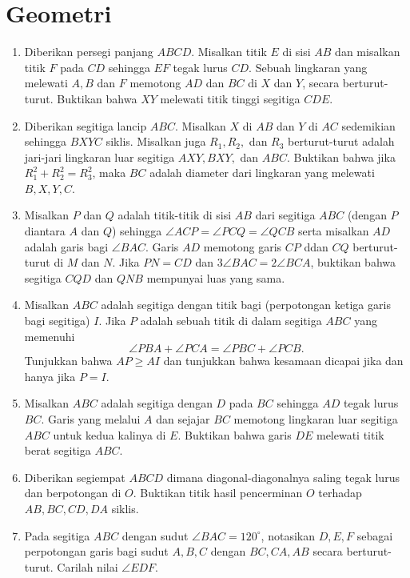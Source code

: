 \documentclass[12pt]{article}
\begin{document}
\section{Geometri}
\begin{enumerate}
	\item
	Diberikan persegi panjang $ABCD$. Misalkan titik $E$ di sisi $AB$ dan misalkan titik $F$ pada $CD$ sehingga $EF$ tegak lurus $CD$. Sebuah lingkaran yang melewati $A,B$ dan $F$ memotong $AD$ dan $BC$ di $X$ dan $Y$, secara berturut-turut. Buktikan bahwa $XY$ melewati titik tinggi segitiga $CDE$.
	
	\item
	Diberikan segitiga lancip $ABC$. Misalkan $X$ di $AB$ dan $Y$ di $AC$ sedemikian sehingga $BXYC$ siklis. Misalkan juga $R_1,R_2,$ dan $R_3$ berturut-turut adalah jari-jari lingkaran luar segitiga $AXY, BXY,$ dan $ABC$. Buktikan bahwa jika $R_1^2+R_2^2=R_3^2$, maka $BC$ adalah diameter dari lingkaran yang melewati $B,X,Y,C$.
	
	\item
	Misalkan $P$ dan $Q$ adalah titik-titik di sisi $AB$ dari segitiga $ABC$ (dengan $P$ diantara $A$ dan $Q$) sehingga $\angle ACP = \angle PCQ = \angle QCB$ serta misalkan $AD$ adalah garis bagi $\angle BAC$. Garis $AD$ memotong garis $CP$ ddan $CQ$ berturut-turut di $M$ dan $N$. Jika $PN=CD$ dan $3\angle BAC=2\angle BCA$, buktikan bahwa segitiga $CQD$ dan $QNB$ mempunyai luas yang sama.
	
	\item
	Misalkan $ABC$ adalah segitiga dengan titik bagi (perpotongan ketiga garis bagi segitiga) $I$. Jika $P$ adalah sebuah titik di dalam segitiga $ABC$ yang memenuhi
	\[
	\angle PBA + \angle PCA = \angle PBC + \angle PCB.
	\]
	Tunjukkan bahwa $AP \geq AI$ dan tunjukkan bahwa kesamaan dicapai jika dan hanya jika $P=I$. 
	
	\item
	Misalkan $ABC$ adalah segitiga dengan $D$ pada $BC$ sehingga $AD$ tegak lurus $BC$. Garis yang melalui $A$ dan sejajar $BC$ memotong lingkaran luar segitiga $ABC$ untuk kedua kalinya di $E$. Buktikan bahwa garis $DE$ melewati titik berat segitiga $ABC$.
	
	\item
	Diberikan segiempat $ABCD$ dimana diagonal-diagonalnya saling tegak lurus dan berpotongan di $O$. Buktikan titik hasil pencerminan $O$ terhadap $AB,BC,CD,DA$ siklis.
	
	\item
	Pada segitiga $ABC$ dengan sudut $\angle BAC = 120^\circ$, notasikan $D,E,F$ sebagai perpotongan garis bagi sudut $A,B,C$ dengan $BC,CA,AB$ secara berturut-turut. Carilah nilai $\angle EDF$.
	

\end{enumerate}
\end{document}
